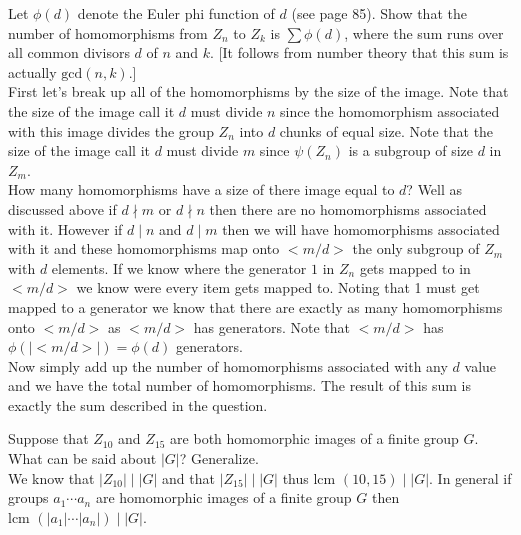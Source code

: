 \documentclass[12pt]{article}
\makeatletter
\theoremstyle{homework}
\newenvironment{exercise}[1]
{\def\@currentlabel{#1}\exercisecore}
{\endexercisecore}
\makeatother
\begin{document}
\begin{exercise}{10.43}
Let $\phi(d)$ denote the Euler phi function of $d$ (see page 85). Show that the number of homomorphisms from $Z_n$ to $Z_k$ is $\sum\phi(d)$, where the sum runs over all common divisors $d$ of $n$ and $k$. [It follows from number theory that this sum is actually $\text{gcd}(n, k)$.]\\
First let's break up all of the homomorphisms by the size of the image.  Note that the size of the image call it $d$ must divide $n$ since the homomorphism associated with this image divides the group $Z_n$ into $d$ chunks of equal size.  Note that the size of the image call it $d$ must divide $m$ since $\psi(Z_n)$ is a subgroup of size $d$ in $Z_m$.\\
How many homomorphisms have a size of there image equal to $d$?  Well as discussed above if $d\nmid m$ or $d\nmid n$ then there are no homomorphisms associated with it.  However if $d\mid n$ and $d\mid m$ then we will have homomorphisms associated with it and these homomorphisms map onto $<m/d>$ the only subgroup of $Z_m$ with $d$ elements.  If we know where the generator $1$ in $Z_n$ gets mapped to in $<m/d>$ we know were every item gets mapped to.  Noting that 1 must get mapped to a generator we know that there are exactly as many homomorphisms onto $<m/d>$ as $<m/d>$ has generators.  Note that $<m/d>$ has $\phi(|<m/d>|)=\phi(d)$ generators.\\
Now simply add up the number of homomorphisms associated with any $d$ value and we have the total number of homomorphisms.  The result of this sum is exactly the sum described in the question.
\end{exercise}

\begin{exercise}{10.48}
Suppose that $Z_{10}$ and $Z_{15}$ are both homomorphic images of a finite group $G$. What can be said about $|G|$? Generalize.\\
We know that $|Z_{10}|\mid |G|$ and that $|Z_{15}|\mid |G|$ thus $\text{lcm } (10,15)\mid |G|$.  In general if groups $a_1\cdots a_n$ are homomorphic images of a finite group $G$ then $\text{lcm } (|a_1|\cdots |a_n|)\mid |G|$.
\end{exercise}
\end{document}
